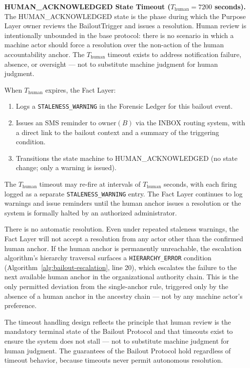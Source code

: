 \bigskip

\noindent\textbf{HUMAN\_ACKNOWLEDGED State Timeout ($T_{\text{human}} = 7200$ seconds).} The HUMAN\_ACKNOWLEDGED state is the phase during which the Purpose Layer owner reviews the BailoutTrigger and issues a resolution. Human review is intentionally unbounded in the base protocol: there is no scenario in which a machine actor should force a resolution over the non-action of the human accountability anchor. The $T_{\text{human}}$ timeout exists to address notification failure, absence, or oversight --- not to substitute machine judgment for human judgment.

When $T_{\text{human}}$ expires, the Fact Layer:
\begin{enumerate}\setlength\itemsep{0.2em}
\item Logs a \texttt{STALENESS\_WARNING} in the Forensic Ledger for this bailout event.
\item Issues an SMS reminder to $\text{owner}(B)$ via the INBOX routing system, with a direct link to the bailout context and a summary of the triggering condition.
\item Transitions the state machine to HUMAN\_ACKNOWLEDGED (no state change; only a warning is issued).
\end{enumerate}

The $T_{\text{human}}$ timeout may re-fire at intervals of $T_{\text{human}}$ seconds, with each firing logged as a separate \texttt{STALENESS\_WARNING} entry. The Fact Layer continues to log warnings and issue reminders until the human anchor issues a resolution or the system is formally halted by an authorized administrator.

There is no automatic resolution. Even under repeated staleness warnings, the Fact Layer will not accept a resolution from any actor other than the confirmed human anchor. If the human anchor is permanently unreachable, the escalation algorithm's hierarchy traversal surfaces a \texttt{HIERARCHY\_ERROR} condition (Algorithm~\ref{alg:bailout-escalation}, line 20), which escalates the failure to the next available human anchor in the organizational authority chain. This is the only permitted deviation from the single-anchor rule, triggered only by the absence of a human anchor in the ancestry chain --- not by any machine actor's preference.

\bigskip

The timeout handling design reflects the principle that human review is the mandatory terminal state of the Bailout Protocol and that timeouts exist to ensure the system does not stall --- not to substitute machine judgment for human judgment. The guarantees of the Bailout Protocol hold regardless of timeout behavior, because timeouts never permit autonomous resolution.
